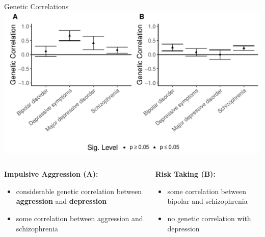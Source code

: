 \documentclass{beamer}
\begin{document}
\begin{frame}[t]{Genetic Correlations}
  \includegraphics[width=0.8\linewidth]{../ukb_psychiatric/figures/combined_corr.pdf}
  \begin{columns}[T]
    \tiny
    \begin{column}[T]{0.5\textwidth}
      \textbf{Impulsive Aggression (A):}\\
      \begin{itemize}
        \item considerable genetic correlation between \textbf{aggression} and \textbf{depression}
        \item some correlation between aggression and schizophrenia
      \end{itemize}
    \end{column}
    \begin{column}[T]{0.5\textwidth}
      \textbf{Risk Taking (B):}\\
      \begin{itemize}
        \item some correlation between bipolar and schizophrenia
        \item no genetic correlation with depression
      \end{itemize}
    \end{column}
  \end{columns}
\end{frame}
\end{document}

